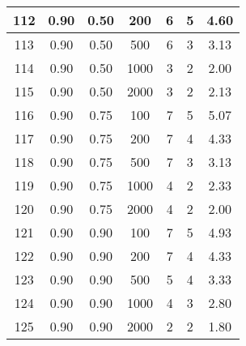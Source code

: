 \documentclass[a4paper, 12pt, unknownkeysallowed]{extreport}
\begin{document}
\begin{center}
\begin{longtable}[c]{|c|c|c|c|c|c|c|}
   112 & 0.90 & 0.50 &   200 &    6 &    5 &  4.60 \\ \hline
   113 & 0.90 & 0.50 &   500 &    6 &    3 &  3.13 \\ \hline
   114 & 0.90 & 0.50 &  1000 &    3 &    2 &  2.00 \\ \hline
   115 & 0.90 & 0.50 &  2000 &    3 &    2 &  2.13 \\ \hline
   116 & 0.90 & 0.75 &   100 &    7 &    5 &  5.07 \\ \hline
   117 & 0.90 & 0.75 &   200 &    7 &    4 &  4.33 \\ \hline
   118 & 0.90 & 0.75 &   500 &    7 &    3 &  3.13 \\ \hline
   119 & 0.90 & 0.75 &  1000 &    4 &    2 &  2.33 \\ \hline
   120 & 0.90 & 0.75 &  2000 &    4 &    2 &  2.00 \\ \hline
   121 & 0.90 & 0.90 &   100 &    7 &    5 &  4.93 \\ \hline
   122 & 0.90 & 0.90 &   200 &    7 &    4 &  4.33 \\ \hline
   123 & 0.90 & 0.90 &   500 &    5 &    4 &  3.33 \\ \hline
   124 & 0.90 & 0.90 &  1000 &    4 &    3 &  2.80 \\ \hline
   125 & 0.90 & 0.90 &  2000 &    2 &    2 &  1.80 \\ \hline
  \end{longtable}
\end{center}

\clearpage
\end{document}
